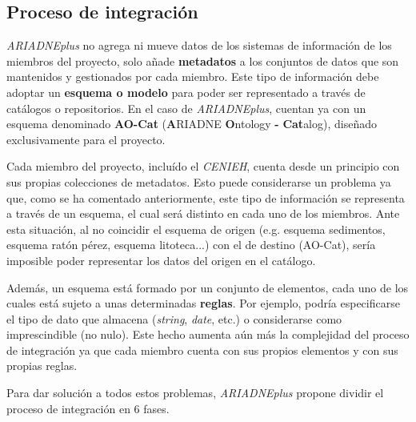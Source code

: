 \subsection{Proceso de integración}

\emph{ARIADNEplus} no agrega ni mueve datos de los sistemas de información de
los miembros del proyecto, solo añade \textbf{metadatos} a los conjuntos
de datos que son mantenidos y gestionados por cada miembro. Este tipo de 
información debe adoptar un \textbf{esquema o modelo} para poder ser
representado a través de catálogos o repositorios. En el caso de
\emph{ARIADNEplus}, cuentan ya con un esquema denominado \textbf{AO-Cat}
(\textbf{A}RIADNE \textbf{O}ntology \textbf{-} \textbf{Cat}alog),
diseñado exclusivamente para el proyecto.

Cada miembro del proyecto, incluído el \emph{CENIEH}, cuenta desde un principio
con sus propias colecciones de metadatos. Esto puede considerarse un
problema ya que, como se ha comentado anteriormente, este tipo de
información se representa a través de un esquema, el cual será distinto
en cada uno de los miembros. Ante esta situación, al no coincidir el
esquema de origen (e.g. esquema sedimentos, esquema ratón pérez, esquema litoteca...) 
con el de destino (AO-Cat), sería imposible poder representar los datos del origen en el catálogo.


Además, un esquema está formado por un conjunto de elementos, cada uno
de los cuales está sujeto a unas determinadas \textbf{reglas}. Por ejemplo,
podría especificarse el tipo de dato que almacena (\emph{string},
\emph{date}, etc.) o considerarse como imprescindible (no nulo). Este
hecho aumenta aún más la complejidad del proceso de integración ya que
cada miembro cuenta con sus propios elementos y con sus propias reglas.

Para dar solución a todos estos problemas, \emph{ARIADNEplus} propone dividir
el proceso de integración en 6 fases.


